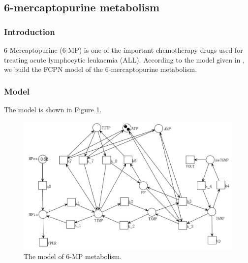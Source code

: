 \documentclass[journal,a4paper,onecolumn]{article}
\begin{document}
\clearpage
\subsection{6-mercaptopurine metabolism}
\subsubsection{Introduction}
6-Mercaptopurine (6-MP) is one of the important chemotherapy drugs used for treating acute lymphocytic leukaemia (ALL). According to the model given in \cite{lavrova2017ordinary,lavrova2016ode}, we build the FCPN model of the 6-mercaptopurine metabolism.

\subsubsection{Model}
The model is shown in Figure \ref{fig:The model of 6-MP metabolism}.

\begin{figure}[!hbt]
	\begin{center}
		\includegraphics[width=\columnwidth]{fig53}
		\caption{The model of 6-MP metabolism.}
		\label{fig:The model of 6-MP metabolism}
	\end{center}
\end{figure}
\end{document}
